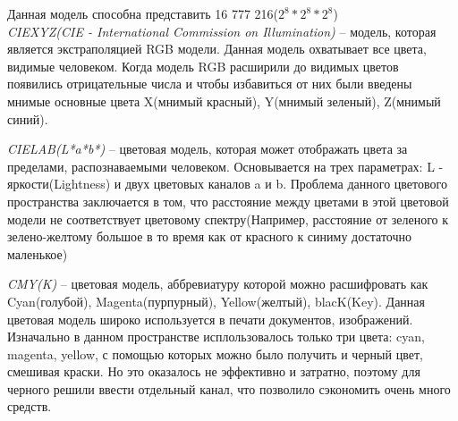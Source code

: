 Данная модель способна представить 16 777 216(\(2^8 * 2^8 * 2^8\))\\

\textit{CIEXYZ(CIE - International Commission on Illumination)} -- модель, которая является экстраполяцией RGB модели. Данная модель охватывает все цвета, видимые человеком. Когда модель RGB расширили до видимых цветов появились отрицательные числа и чтобы избавиться от них были введены мнимые основные цвета X(мнимый красный), Y(мнимый зеленый), Z(мнимый синий).

\textit{CIELAB(L*a*b*)} -- цветовая модель, которая может отображать цвета за пределами, распознаваемыми человеком. Основывается на трех параметрах: L - яркости(Lightness) и двух цветовых каналов a и b. Проблема данного цветового пространства заключается в том, что расстояние между цветами в этой цветовой модели не соответствует цветовому спектру(Например, расстояние от зеленого к зелено-желтому большое в то время как от красного к синиму достаточно маленькое)

\begin{figure}[ht!]
\end{figure}

\textit{CMY(K)} -- цветовая модель, аббревиатуру которой можно расшифровать как Cyan(голубой), Magenta(пурпурный), Yellow(желтый), blacK(Key). Данная цветовая модель широко используется в печати документов, изображений. Изначально в данном пространстве исплользовалось только три цвета: cyan, magenta, yellow, с помощью которых можно было получить и черный цвет, смешивая краски. Но это оказалось не эффективно и затратно, поэтому для черного решили ввести отдельный канал, что позволило сэкономить очень много средств.

\begin{figure}[ht!]
\end{figure}


